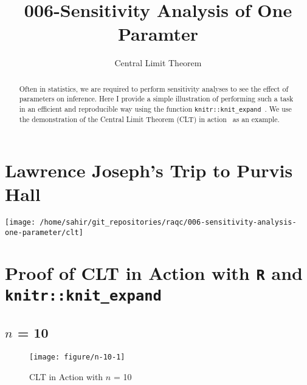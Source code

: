 \documentclass[11pt,letter]{article}\usepackage[]{graphicx}\usepackage[]{color}
\makeatletter
\def\maxwidth{ %
  \ifdim\Gin@nat@width>\linewidth
    \linewidth
  \else
    \Gin@nat@width
  \fi
}
\newenvironment{knitrout}{}{} %
\makeatother
\begin{document}
\pagestyle{fancy}

\title{006-Sensitivity Analysis of One Paramter}
\author{Central Limit Theorem}
\maketitle







\begin{abstract}
Often in statistics, we are required to perform sensitivity analyses to see the effect of parameters on inference. Here I provide a simple illustration of performing such a task in an efficient and reproducible way using the function \texttt{knitr::knit\_expand}~\citep{k1,k2,k3}. We use the demonstration of the Central Limit Theorem (CLT) in action~\citep{joseph} as an example.
\end{abstract}


\tableofcontents

\section{Lawrence Joseph's Trip to Purvis Hall}


\begin{knitrout}
\color{fgcolor}
\texttt{[image: /home/sahir/git\_repositories/raqc/006-sensitivity-analysis-one-parameter/clt]} 

\end{knitrout}


\FloatBarrier

\section{Proof of CLT in Action with \texttt{R} and \texttt{knitr::knit\_expand}}





\newpage
\subsection{$n$ = 10}

\begin{knitrout}
\color{fgcolor}\begin{figure}[h]

{\centering \texttt{[image: figure/n-10-1]} 

}

\caption[CLT in Action with $n$ = 10]{CLT in Action with $n$ = 10}\label{fig:n-10}
\end{figure}


\end{knitrout}
\newpage
\end{document}
